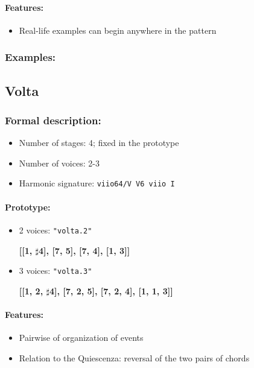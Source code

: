\documentclass[11pt, openany]{article}
\begin{document}
\paragraph{Features:}
\begin{itemize}
\item Real-life examples can begin anywhere in the pattern
\end{itemize}

\subsubsection{Examples:}


	\subsection{Volta}
	
\subsubsection{Formal description:}
\begin{itemize}
\item Number of stages: 4; fixed in the prototype
\item Number of voices: 2-3
\item Harmonic signature: \texttt{viio64/V V6 viio I}
\end{itemize}

\paragraph{Prototype:}
\begin{itemize}
\item 2 voices: \texttt{"volta.2"}
	\begin{center}
	\textbf{[[1, $\sharp$4], [7, 5], [7, 4], [1, 3]]}
	\end{center}
\item 3 voices: \texttt{"volta.3"}
	\begin{center}
	\textbf{[[1, 2, $\sharp$4], [7, 2, 5], [7, 2, 4], [1, 1, 3]]}
	\end{center}
\end{itemize}

\paragraph{Features:}
\begin{itemize}
\item Pairwise of organization of events
\item Relation to the Quiescenza: reversal of the two pairs of chords
\end{itemize}
\end{document}
